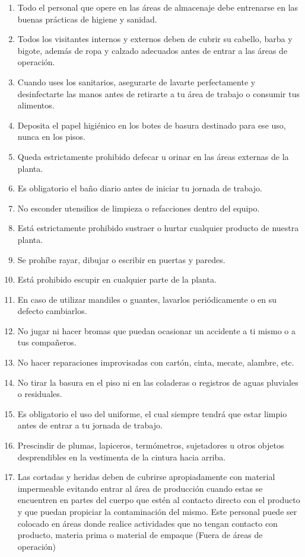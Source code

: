 \begin{enumerate}
	\item Todo el personal que opere en las áreas de almacenaje debe entrenarse en las buenas prácticas de higiene y sanidad.
	\item Todos los visitantes internos y externos deben de cubrir su cabello, barba y bigote, además de ropa y calzado adecuados antes de entrar a las áreas de operación.
	\item Cuando uses los sanitarios, asegurarte de lavarte perfectamente y desinfectarte las manos antes de retirarte a tu área de trabajo o consumir tus alimentos.
	\item Deposita el papel higiénico en los botes de basura destinado para ese uso, nunca en los pisos.
	\item Queda estrictamente prohibido defecar u orinar en las áreas externas de la planta.
	\item Es obligatorio el baño diario antes de iniciar tu jornada de trabajo.
	\item No esconder utensilios de limpieza o refacciones dentro del equipo.
	\item Está estrictamente prohibido sustraer o hurtar cualquier producto de nuestra planta.
	\item Se prohíbe rayar, dibujar o escribir en puertas y paredes.
	\item Está prohibido escupir en cualquier parte de la planta.
	\item En caso de utilizar mandiles o guantes, lavarlos periódicamente o en su defecto cambiarlos.
	\item No jugar ni hacer bromas que puedan ocasionar un accidente a ti mismo o a tus compañeros.
	\item No hacer reparaciones improvisadas con cartón, cinta, mecate, alambre, etc.
	\item No tirar la basura en el piso ni en las coladeras o registros de aguas pluviales o residuales.
	\item Es obligatorio el uso del uniforme, el cual siempre tendrá que estar limpio antes de entrar a tu jornada de trabajo.
	\item Prescindir de plumas, lapiceros, termómetros, sujetadores u otros objetos desprendibles en la vestimenta de la cintura hacia arriba.
	\item Las cortadas y heridas deben de cubrirse apropiadamente con material impermeable evitando entrar al área de producción cuando estas se encuentren en partes del cuerpo que estén al contacto directo con el producto y que puedan propiciar la contaminación del mismo. Este personal puede ser colocado en áreas donde realice actividades que no tengan contacto con producto, materia prima o material de empaque (Fuera de áreas de operación)

\end{enumerate}
